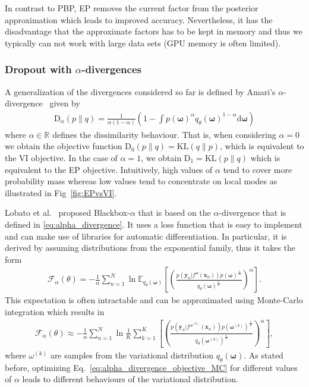 \documentclass[runningheads]{llncs}
\begin{document}
In contrast to PBP, EP removes the current factor from the posterior approximation which leads to improved accuracy. 
Nevertheless, it has the disadvantage that the approximate factors has to be kept in memory and thus we typically can not work with large data sets (GPU memory is often limited).

\subsubsection{Dropout with $\alpha$-divergences}
\label{sec:droput_alpha_divergence}
A generalization of the divergences considered so far is defined by Amari's $\alpha$-divergence~\cite{amari2012differential} given by
\begin{align}
    \mathrm{D}_{\alpha}(p \| q) = \frac{1}{\alpha(1 - \alpha)} \left(1 - \int p(\boldsymbol{\omega})^\alpha q_\theta(\boldsymbol{\omega})^{1 - \alpha} \mathrm{d}\boldsymbol{\omega}\right)\label{eq:alpha_divergence}
\end{align}
where $\alpha \in \mathbb{R}$ defines the dissimilarity behaviour.
That is, when considering $\alpha = 0$ we obtain the objective function $\mathrm{D}_0(p \| q) = \mathrm{KL}(q\|p)$, which is equivalent to the VI objective. 
In the case of $\alpha = 1$, we obtain $\mathrm{D}_1 = \mathrm{KL}(p\|q)$ which is equivalent to the EP objective.
Intuitively, high values of $\alpha$ tend to cover more probability mass whereas low values tend to concentrate on local modes as illustrated in Fig~\ref{fig:EPvsVI}.

Lobato et al.~\cite{hernandez2016black} proposed Blackbox-$\alpha$ that is based on the $\alpha$-divergence that is defined in \ref{eq:alpha_divergence}.
It uses a loss function that is easy to implement and can make use of libraries for automatic differentiation.
In particular, it is derived by assuming distributions from the exponential family, thus it takes the form 
\begin{align}
\mathcal{F}_\alpha (\theta) = - \frac{1}{\alpha} \sum_{n =1}^N \ln\mathbb{E}_{q_\theta(\mathbf{\omega})}\left[ \left( \frac{p(\mathbf{y}_n| f^{\boldsymbol{\omega}}(\mathbf{x}_n))p(\boldsymbol{\omega})^\frac{1}{N}}{q_\theta(\boldsymbol{\omega})^\frac{1}{N}}\right)^\alpha\right].\label{eq:alpha_divergence_objective}
\end{align}
This expectation is often intractable and can be approximated using Monte-Carlo integration which results in
\begin{align}
\mathcal{F}_\alpha (\theta) \approx - \frac{1}{\alpha} \sum_{n =1}^N \ln \frac{1}{K}\sum_{k=1}^K
\left[ \left( \frac{p(\mathbf{y}_n| f^{\boldsymbol{\omega}^{(k)}}(\mathbf{x}_n))p(\boldsymbol{\omega}^{(k)})^\frac{1}{N}}{q_\theta(\boldsymbol{\omega}^{(k)})^\frac{1}{N}}\right)^\alpha\right],\label{eq:alpha_divergence_objective_MC}
\end{align}
where $\omega^{(k)}$ are samples from the variational distribution $q_\theta(\boldsymbol{\omega})$.
As stated before, optimizing Eq.~\ref{eq:alpha_divergence_objective_MC} for different values of $\alpha$ leads to different behaviours of the variational distribution.
\end{document}
